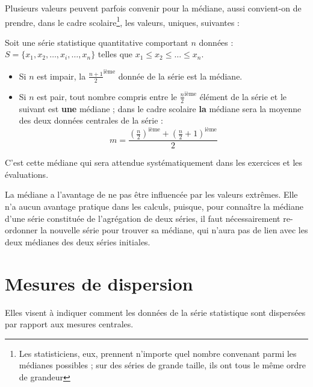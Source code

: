 Plusieurs valeurs peuvent parfois convenir pour la m\'ediane, aussi convient-on de prendre, dans le cadre scolaire\footnote{Les statisticiens, eux, prennent n'importe quel nombre convenant parmi les m\'edianes possibles ; sur des s\'eries de grande taille, ils ont tous le m\^eme ordre de grandeur}, les valeurs, uniques, suivantes :

\begin{definition}
Soit une s\'erie statistique quantitative comportant $n$ donn\'ees : $S=\{x_1,x_2,\ldots,x_i,\ldots,x_n\}$ telles que $x_1\leqslant x_2\leqslant \ldots \leqslant x_n$.
\begin{itemize}
	\item Si $n$ est impair, la $\frac{n+1}{2}^{\text{i\`eme}}$ donn\'ee de la s\'erie est la m\'ediane.
	\item Si $n$ est pair, tout nombre compris entre le $\frac{n}{2}^{\text{i\`eme}}$ \'el\'ement de la s\'erie et le suivant est \textbf{une} m\'ediane ; dans le cadre scolaire \textbf{la} m\'ediane sera la moyenne des deux donn\'ees centrales de la s\'erie :
	      \[m=\frac{\left(\frac{n}{2}\right)^{\text{i\`eme}}+\left(\frac{n}{2}+1\right)^{\text{i\`eme}}}{2}\]
\end{itemize}
\end{definition}

C'est cette m\'ediane qui sera attendue syst\'ematiquement dans les exercices et les \'evaluations.

\medskip

La m\'ediane a l'avantage de ne pas \^etre influenc\'ee par les valeurs extr\^emes. Elle n'a aucun avantage pratique dans les calculs, puisque, pour conna\^itre la m\'ediane d'une s\'erie constitu\'ee de l'agr\'egation de deux s\'eries, il faut n\'ecessairement re-ordonner la nouvelle s\'erie pour trouver sa m\'ediane, qui n'aura pas de lien avec les deux m\'edianes des deux s\'eries initiales.


\section{Mesures de dispersion}

 \begin{encadrer}\begin{Large}Elles visent \`a indiquer comment les donn\'ees de la s\'erie statistique sont dispers\'ees par rapport aux mesures centrales. \end{Large}\end{encadrer}

